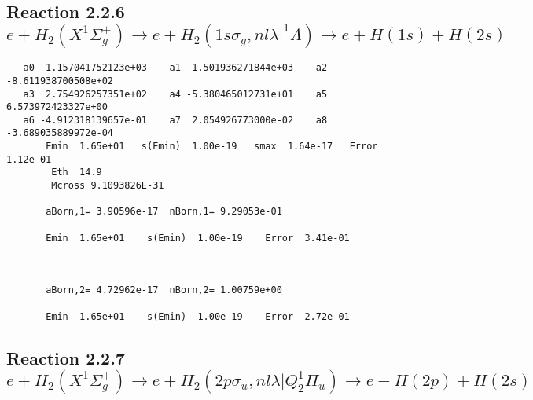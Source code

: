 \documentclass[12pt,dvipdfm]{article}
\begin{document}
\newpage
\subsection{
Reaction 2.2.6 $e + H_2(X^1\Sigma_g^+) \rightarrow e + H_2(1s\sigma_g,nl\lambda|^1\Lambda) \rightarrow e +  H(1s) + H(2s)$}
















\begin{small}\begin{verbatim}
   a0 -1.157041752123e+03    a1  1.501936271844e+03    a2 -8.611938700508e+02
   a3  2.754926257351e+02    a4 -5.380465012731e+01    a5  6.573972423327e+00
   a6 -4.912318139657e-01    a7  2.054926773000e-02    a8 -3.689035889972e-04
       Emin  1.65e+01   s(Emin)  1.00e-19   smax  1.64e-17   Error  1.12e-01
        Eth  14.9
        Mcross 9.1093826E-31

       aBorn,1= 3.90596e-17  nBorn,1= 9.29053e-01

       Emin  1.65e+01    s(Emin)  1.00e-19    Error  3.41e-01



       aBorn,2= 4.72962e-17  nBorn,2= 1.00759e+00

       Emin  1.65e+01    s(Emin)  1.00e-19    Error  2.72e-01
\end{verbatim}\end{small}






\newpage
\subsection{
Reaction 2.2.7 $ e + H_2(X^1\Sigma_g^+) \rightarrow e + H_2(2p\sigma_u, nl\lambda|Q_2^1\Pi_u) \rightarrow e + H(2p) + H(2s)$}






\end{document}
